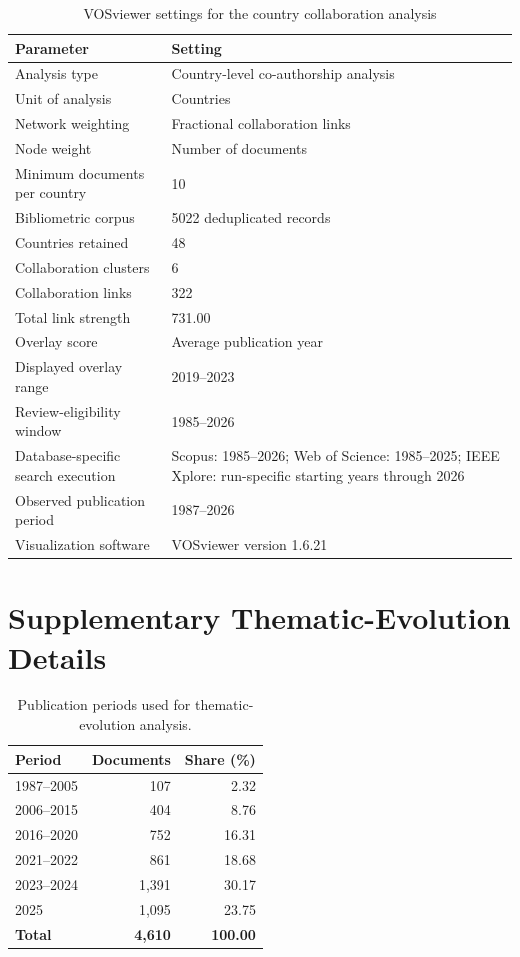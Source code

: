 \documentclass[12pt]{article}
\numberwithin{equation}{section}
\begin{document}
\begin{table}[htbp]
\centering
\caption{VOSviewer settings for the country collaboration analysis}
\label{tab:country-collaboration-settings}
\begin{tabular}{p{6.0cm}p{6.2cm}}
\toprule
\textbf{Parameter} & \textbf{Setting} \\
\midrule
Analysis type & Country-level co-authorship analysis \\
Unit of analysis & Countries \\
Network weighting & Fractional collaboration links \\
Node weight & Number of documents \\
Minimum documents per country & 10 \\
Bibliometric corpus & 5022 deduplicated records \\
Countries retained & 48 \\
Collaboration clusters & 6 \\
Collaboration links & 322 \\
Total link strength & 731.00 \\
Overlay score & Average publication year \\
Displayed overlay range & 2019--2023 \\
Review-eligibility window
&1985--2026\\
Database-specific search execution&
Scopus: 1985--2026; Web of Science: 1985--2025;
IEEE Xplore: run-specific starting years through 2026
\\
Observed publication period & 1987--2026 \\
Visualization software & VOSviewer version 1.6.21 \\
\bottomrule
\end{tabular}
\end{table}
\FloatBarrier


\FloatBarrier
\section{Supplementary Thematic-Evolution Details}
\label{sec:supp-thematic-evolution-details}

\begin{table}[!htbp]
\centering
\caption{Publication periods used for thematic-evolution analysis.}
\label{tab:thematic_evolution_periods}
\begin{tabular}{lrr}
\toprule
\textbf{Period} &
\textbf{Documents} &
\textbf{Share (\%)} \\
\midrule
1987--2005 & 107 & 2.32 \\
2006--2015 & 404 & 8.76 \\
2016--2020 & 752 & 16.31 \\
2021--2022 & 861 & 18.68 \\
2023--2024 & 1,391 & 30.17 \\
2025 & 1,095 & 23.75 \\
\bottomrule
\textbf{Total} & \textbf{4,610} & \textbf{100.00} \\
\hline
\end{tabular}
\end{table}
\FloatBarrier
\end{document}

